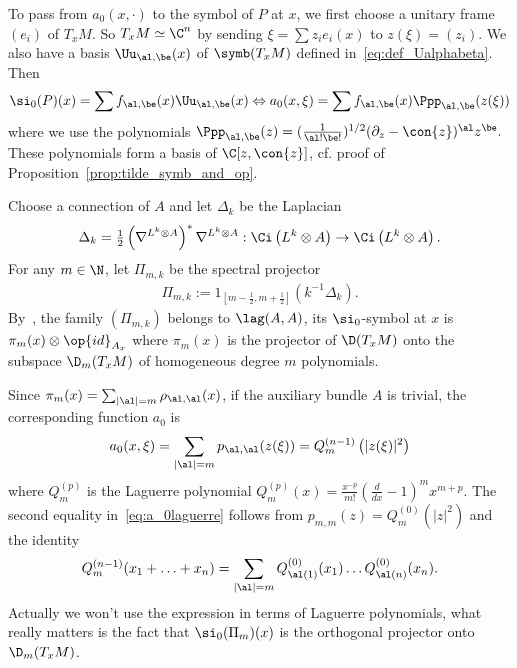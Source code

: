 To pass from $a_0(x,\cdot)$ to the symbol of $P$ at $x$, we first choose a unitary frame $(e_i)$ of $T_xM$. So $T_xM \simeq \C^n$ by sending $\xi = \sum z_i e_i(x) $ to $z(\xi)= (z_i)$. We also have a basis $\Uu_{\al, \be}(x)$ of $\symb (T_xM) $ defined in~\eqref{eq:def_Ualphabeta}. Then
\[
\si_0(P) (x) = \sum f_{\al, \be} (x) \Uu_{\al,\be} (x) \Leftrightarrow
a_0 (x,\xi) = \sum f_{\al, \be} (x) \Ppp_{\al, \be} (z(\xi))
\]
where we use the polynomials $ \Ppp_{\al, \be} (z) = (\frac{1}{\al! \be !}) ^{1/2} (
\partial_z - \con{z})^{\al} z^\be.$ These polynomials form a basis of $\C [z,
\con{z}]$, cf. proof of Proposition~\ref{prop:tilde_symb_and_op}.

\begin{exam}\label{exemple:projecteur}
Choose a connection of $A$ and let $\Delta_k$ be the Laplacian
\begin{gather}\label{eq:laplacien_fibre_auxiliaire}
\Delta_k = \tfrac{1}{2} \left(\nabla^{L^k
\otimes A}\right)^* \nabla^{L^k \otimes A} : \Ci\left(L^k \otimes A\right) \rightarrow \Ci \left(L^k \otimes A\right).
\end{gather}
For any $m \in \N$, let $\Pi_{m,k}$ be the spectral projector
\begin{gather}\label{eq:projecteur_fibre_auxiliaire}
\Pi_{m,k} := 1_{\left[m - \frac{1}{2}, m +
\frac{1}{2}\right]} \left(k^{-1} \Delta_k\right).
\end{gather}
By~\cite{oim_copain}, the family $(\Pi_{m,k})$ belongs to $\lag(A,A)$, its $\si_0$-symbol at $x$ is $\pi_m(x) \otimes \op{id}_{A_x}$ where $\pi_m(x)$ is the projector of $\D (T_xM)$ onto the subspace $\D_m(T_xM)$ of homogeneous degree $m$ polynomials.

Since $\pi_m (x) = \sum_{|\al|=m} \rho_{\al, \al}(x)$, if the auxiliary bundle $A$ is trivial, the corresponding function $a_0$ is
\begin{gather}\label{eq:a_0laguerre}
a_0(x, \xi) = \sum_{|\al| =m} p_{\al,\al}(z(\xi)) = Q_m^{(n-1)} \left(|z(\xi)|^2\right)
\end{gather}
where $Q_m^{(p)} $ is the Laguerre polynomial $Q^{(p)}_m (x) = \frac{x^{-p}}{m!}(\frac{d}{dx} -1) ^m x ^{m+p}$. The second equality in~\eqref{eq:a_0laguerre} follows from $p_{m,m} (z) = Q_m^{(0)} (|z|^2)$ and the identity
\[
Q_m^{(n-1)} (x_1+ \ldots + x_n) =
\sum_{|\al| = m } Q_{\al(1)}^{(0)} (x_1) \ldots Q_{\al(n)}^{(0)} (x_n).
\]
Actually we won't use the expression in terms of Laguerre polynomials, what really matters is the fact that $\si_0 (\Pi_m) (x)$ is the orthogonal projector onto $\D _m(T_xM)$.
\end{exam}

